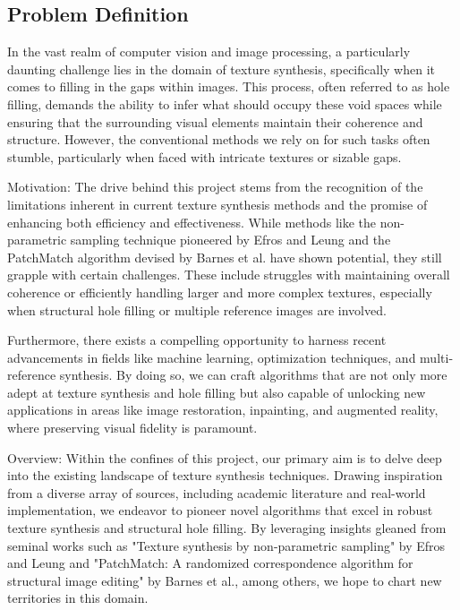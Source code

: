 \begin{introduction}

\section{Problem Definition}

In the vast realm of computer vision and image processing, a particularly daunting challenge lies in the domain of texture synthesis, specifically when it comes to filling in the gaps within images. This process, often referred to as hole filling, demands the ability to infer what should occupy these void spaces while ensuring that the surrounding visual elements maintain their coherence and structure. However, the conventional methods we rely on for such tasks often stumble, particularly when faced with intricate textures or sizable gaps.



Motivation: 
The drive behind this project stems from the recognition of the limitations inherent in current texture synthesis methods and the promise of enhancing both efficiency and effectiveness. While methods like the non-parametric sampling technique pioneered by Efros and Leung and the PatchMatch algorithm devised by Barnes et al. have shown potential, they still grapple with certain challenges. These include struggles with maintaining overall coherence or efficiently handling larger and more complex textures, especially when structural hole filling or multiple reference images are involved.

Furthermore, there exists a compelling opportunity to harness recent advancements in fields like machine learning, optimization techniques, and multi-reference synthesis. By doing so, we can craft algorithms that are not only more adept at texture synthesis and hole filling but also capable of unlocking new applications in areas like image restoration, inpainting, and augmented reality, where preserving visual fidelity is paramount.

Overview: Within the confines of this project, our primary aim is to delve deep into the existing landscape of texture synthesis techniques. Drawing inspiration from a diverse array of sources, including academic literature and real-world implementation, we endeavor to pioneer novel algorithms that excel in robust texture synthesis and structural hole filling. By leveraging insights gleaned from seminal works such as "Texture synthesis by non-parametric sampling" by Efros and Leung and "PatchMatch: A randomized correspondence algorithm for structural image editing" by Barnes et al., among others, we hope to chart new territories in this domain.


\end{introduction}
